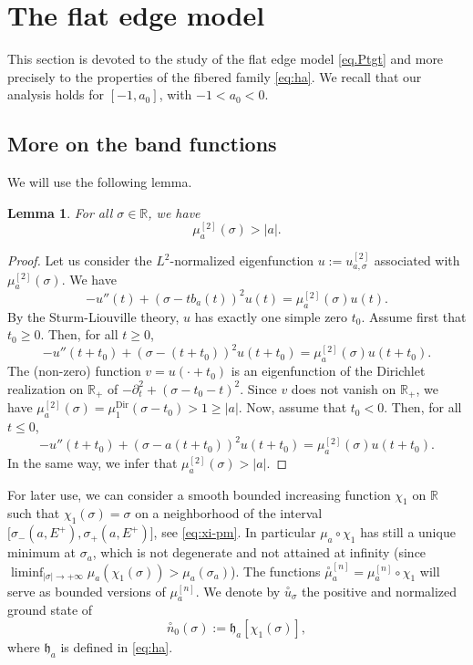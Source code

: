 \documentclass[JEP,XML,SOM,Unicode,NoFloatCountersInSection,published]{cedram}
\newcommand{\Dir}{\mathrm{Dir}}
\theoremstyle{plain}
\newtheorem{lemma}[theorem]{Lemma}
\theoremstyle{definition}
\newcommand{\R}{\mathbb{R}}
\begin{document}
\section{The flat edge model}\label{sec:FlatEdge}
This section is devoted to the study of the flat edge model \eqref{eq.Ptgt} and more precisely to the properties of the fibered family \eqref{eq:ha}. We recall that our analysis holds for $[-1,a_0]$, with $-1<a_0<0$.

\subsection{More on the band functions}\label{sec.chi1}
We will use the following lemma.
\begin{lemma}\label{lem.mu2}
For all $\sigma\in\R$, we have
\[
\mu_a^{[2]}(\sigma)> |a|.
\] 
\end{lemma}
\begin{proof}
Let us consider the $L^2$-normalized eigenfunction $u:=u^{[2]}_{a,\sigma}$ associated with $\mu_a^{[2]}(\sigma)$. We have
\begin{equation*}
-u''(t)+(\sigma-tb_a(t))^2u(t)=\mu_a^{[2]}(\sigma) u(t).
\end{equation*}
By the Sturm-Liouville theory, $u$ has exactly one simple zero $t_0$. Assume first that $t_0\geq 0$. Then, for all $t\geq 0$,
\[
-u''(t+t_0)+(\sigma-(t+t_0))^2u(t+t_0)=\mu_a^{[2]}(\sigma) u(t+t_0).
\]
The (non-zero) function $v=u(\cdot+t_0)$ is an eigenfunction of the Dirichlet realization on $\R_+$ of $-\partial_t^2+(\sigma-t_0-t)^2$. Since $v$ does not vanish on $\R_+$, we have $\mu_a^{[2]}(\sigma)=\mu^{\Dir}_1(\sigma-t_0)>1\geq |a|$.
Now, assume that $t_0<0$. Then, for all $t\leq 0$,
\[
-u''(t+t_0)+(\sigma-a(t+t_0))^2u(t+t_0)=\mu_a^{[2]}(\sigma) u(t+t_0).
\]
In the same way, we infer that $\mu_a^{[2]}(\sigma)>|a|$.
\end{proof}

For later use, we can consider a smooth bounded increasing function $\chi_1$ on $\R$ such that $\chi_1(\sigma)=\sigma$ on a neighborhood of the interval $[\sigma_-(a,E^+),\sigma_+(a,E^+)\bigr]$, see \eqref{eq:xi-pm}. In particular $\mu_a\circ\chi_1$ has still a unique minimum at $\sigma_a$, which is not degenerate and not attained at infinity (since $\liminf_{|\sigma| \rightarrow +\infty} \mu_a (\chi_1(\sigma))> \mu_a(\sigma_a)$).
The functions $\overset{\circ}{\mu}^{[n]}_a=\mu^{[n]}_a\circ\chi_1$ will serve as bounded versions of $\mu^{[n]}_a$. We denote by $\overset{\circ}{u}_\sigma$ the positive and normalized ground state of
\begin{equation}\label{eq:circ-n}
\overset{\circ}{n}_0(\sigma):=\mathfrak h_a[\chi_1(\sigma)],
\end{equation}
where $\mathfrak h_a$ is defined in \eqref{eq:ha}.
\end{document}
